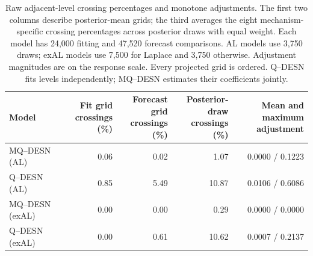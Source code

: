 \begin{table}[!htbp]
\centering
\footnotesize
\setlength{\tabcolsep}{3pt}
\renewcommand{\arraystretch}{1.08}
\begin{tabular}{@{}lrrrr@{}}
\toprule
Model & \shortstack{Fit grid\\crossings (\%)} & \shortstack{Forecast grid\\crossings (\%)} & \shortstack{Posterior-draw\\crossings (\%)} & \shortstack{Mean and maximum\\adjustment} \\
\midrule
MQ--DESN (AL) & 0.06 & 0.02 & 1.07 & 0.0000 / 0.1223 \\
Q--DESN (AL) & 0.85 & 5.49 & 10.87 & 0.0106 / 0.6086 \\
MQ--DESN (exAL) & 0.00 & 0.00 & 0.29 & 0.0000 / 0.0000 \\
Q--DESN (exAL) & 0.00 & 0.61 & 10.62 & 0.0007 / 0.2137 \\
\bottomrule
\end{tabular}
\caption{Raw adjacent-level crossing percentages and monotone adjustments. The first two columns describe posterior-mean grids; the third averages the eight mechanism-specific crossing percentages across posterior draws with equal weight. Each model has 24,000 fitting and 47,520 forecast comparisons. AL models use 3,750 draws; exAL models use 7,500 for Laplace and 3,750 otherwise. Adjustment magnitudes are on the response scale. Every projected grid is ordered. Q--DESN fits levels independently; MQ--DESN estimates their coefficients jointly.}
\label{tab:joint-qdesn-pure-desn-v2-crossings}
\end{table}
